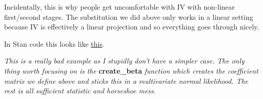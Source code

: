 \documentclass{article}
\begin{document}
Incidentally, this is why people get uncomfortable with IV with non-linear first/second 
stages. The substitution we did above only works in a linear setting because IV 
is effectively a linear projection and so everything goes through nicely.


In Stan code this looks like \href{https://gist.github.com/EdJeeOnGitHub/f728ac156da2d8dafa4dda8cd1a6b336}{this}.

\textit{This is a really bad example as I stupidly don't have a simpler case. The only 
thing worth focusing on is the } \textbf{create\_beta} \textit{function which creates the  
coefficient matrix we define above and sticks this in a multivariate normal 
likelihood. The rest is all sufficient statistic and horseshoe mess.}
\end{document}
